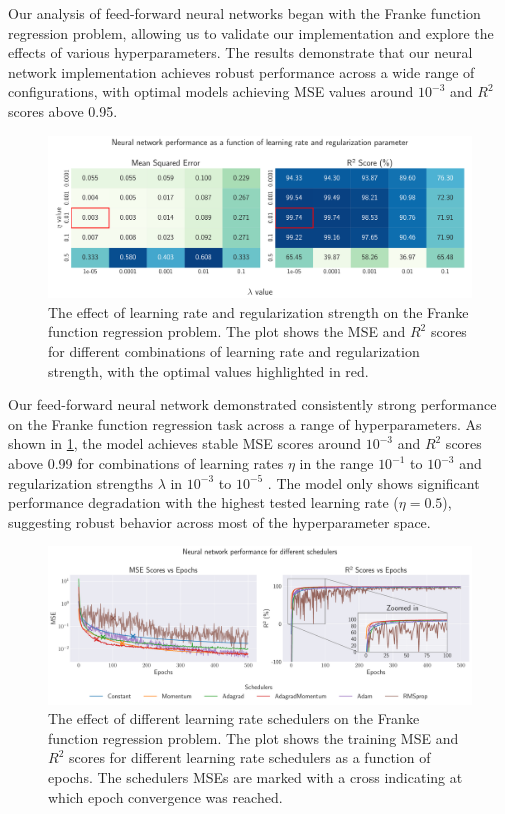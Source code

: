 Our analysis of feed-forward neural networks began with the Franke function regression problem, allowing us to validate our implementation and explore the effects of various hyperparameters. The results demonstrate that our neural network implementation achieves robust performance across a wide range of configurations, with optimal models achieving MSE values around \( 10^{-3} \) and \( R^2 \) scores above 0.95.

\onecolumngrid
\begin{figure}[ht!]
    \centering
    \includegraphics[width = .9\textwidth]{../figs/c_eta_lambda.pdf}
    \caption{The effect of learning rate and regularization strength on the Franke function regression problem. The plot shows the MSE and \( R^2 \) scores for different combinations of learning rate and regularization strength, with the optimal values highlighted in red.}
    \label{fig:NN_Franke_eta_lambda}
\end{figure}
\twocolumngrid

Our feed-forward neural network demonstrated consistently strong performance on the Franke function regression task across a range of hyperparameters. As shown in \cref{fig:NN_Franke_eta_lambda}, the model achieves stable MSE scores around $10^{-3}$ and $R^2$ scores above 0.99 for combinations of learning rates $ \eta $ in the range $ 10^{-1} $ to $ 10^{-3}$ and regularization strengths $ \lambda $ in $ 10^{-3} $ to $ 10^{-5}$ . The model only shows significant performance degradation with the highest tested learning rate ($\eta = 0.5$), suggesting robust behavior across most of the hyperparameter space.

\onecolumngrid
\begin{figure}[ht!]
    \centering
    \includegraphics[width = .9\textwidth]{../figs/b_schedulers.pdf}
    \caption{The effect of different learning rate schedulers on the Franke function regression problem. The plot shows the training MSE and \( R^2 \) scores for different learning rate schedulers as a function of epochs. The schedulers MSEs are marked with a cross indicating at which epoch convergence was reached.}
    \label{fig:NN_Franke_schedulers}
\end{figure}
\twocolumngrid

